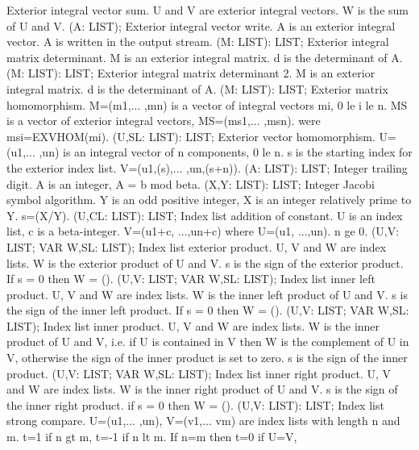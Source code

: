 \bcom Exterior integral vector sum. U and V are exterior
integral vectors. W is the sum of U and V. \ecom 
{} (A: LIST); \eproc
\bcom Exterior integral vector write. A is an exterior
integral vector. A is written in the output stream. \ecom 
{} (M: LIST): LIST; \eproc
\bcom Exterior integral matrix determinant. M is an exterior integral
matrix. d is the determinant of A. \ecom 
{} (M: LIST): LIST; \eproc
\bcom Exterior integral matrix determinant 2. M is an exterior integral
matrix. d is the determinant of A. \ecom 
{} (M: LIST): LIST; \eproc
\bcom Exterior matrix homomorphism. M=(m1,... ,mn) is a
vector of integral vectors mi, 0 le i le n. MS is a
vector of exterior integral vectors, MS=(ms1,... ,msn).
were msi=EXVHOM(mi).  \ecom 
{} (U,SL: LIST): LIST; \eproc
\bcom Exterior vector homomorphism. U=(u1,... ,un) is an
integral vector of n components, 0 le n. s is the
starting index for the exterior index list.
V=(u1,(s),... ,un,(s+n)).  \ecom 
{} (A: LIST): LIST; \eproc
\bcom Integer trailing digit. A is an integer,
A = b mod beta. \ecom 
{} (X,Y: LIST): LIST; \eproc
\bcom Integer Jacobi symbol algorithm. Y is an odd
positive integer, X is an integer relatively prime
to Y. s=(X/Y).  \ecom 
{} (U,CL: LIST): LIST; \eproc
\bcom Index list addition of constant. U is an index list, c is
a beta-integer. V=(u1+c, ...,un+c) where U=(u1, ...,un). 
n ge 0.  \ecom 
{} (U,V: LIST; VAR W,SL: LIST); \eproc
\bcom Index list exterior product. U, V and W are index lists.
W is the exterior product of U and V. s is the sign
of the exterior product. If s = 0 then W = ().  \ecom 
{} (U,V: LIST; VAR W,SL: LIST); \eproc
\bcom Index list inner left product. U, V and W are index lists.
W is the inner left product of U and V. s is the sign
of the inner left product. If s = 0 then W = ().  \ecom 
{} (U,V: LIST; VAR W,SL: LIST); \eproc
\bcom Index list inner product. U, V and W are index lists. W
is the inner product of U and V, i.e. if U is contained
in V then W is the complement of U in V, otherwise the sign
of the inner product is set to zero. s is the sign of
the inner product.  \ecom 
{} (U,V: LIST; VAR W,SL: LIST); \eproc
\bcom Index list inner right product. U, V and W are index lists.
W is the inner right product of U and V. s is the sign
of the inner right product. if s = 0 then W = ().  \ecom 
{} (U,V: LIST): LIST; \eproc
\bcom Index list strong compare. U=(u1,... ,un), V=(v1,... vm)
are index lists with length n and m. t=1 if n gt m,
t=-1 if n lt m. If n=m then t=0 if U=V,
